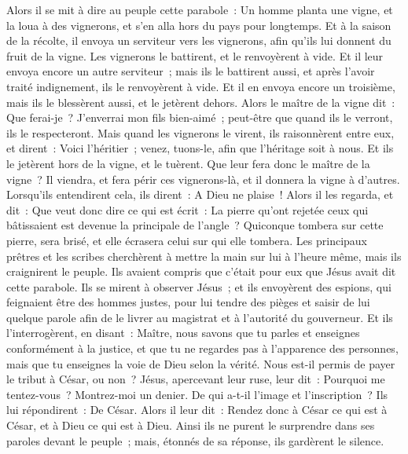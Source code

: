 \begin{multicols}{2}
Alors il se mit à dire au peuple cette parabole~: Un homme planta une vigne, et la loua à des vignerons, et s'en alla hors du pays pour longtemps.
Et à la saison de la récolte, il envoya un serviteur vers les vignerons, afin qu'ils lui donnent du fruit de la vigne. Les vignerons le battirent, et le renvoyèrent à vide.
Et il leur envoya encore un autre serviteur~; mais ils le battirent aussi, et après l'avoir traité indignement, ils le renvoyèrent à vide.
Et il en envoya encore un troisième, mais ils le blessèrent aussi, et le jetèrent dehors.
Alors le maître de la vigne dit~: Que ferai-je~? J'enverrai mon fils bien-aimé~; peut-être que quand ils le verront, ils le respecteront.
Mais quand les vignerons le virent, ils raisonnèrent entre eux, et dirent~: Voici l'héritier~; venez, tuons-le, afin que l'héritage soit à nous.
Et ils le jetèrent hors de la vigne, et le tuèrent. Que leur fera donc le maître de la vigne~?
Il viendra, et fera périr ces vignerons-là, et il donnera la vigne à d'autres. Lorsqu'ils entendirent cela, ils dirent~: A Dieu ne plaise~!
Alors il les regarda, et dit~: Que veut donc dire ce qui est écrit~: La pierre qu'ont rejetée ceux qui bâtissaient est devenue la principale de l'angle~?
Quiconque tombera sur cette pierre, sera brisé, et elle écrasera celui sur qui elle tombera.
Les principaux prêtres et les scribes cherchèrent à mettre la main sur lui à l'heure même, mais ils craignirent le peuple. Ils avaient compris que c'était pour eux que Jésus avait dit cette parabole.
Ils se mirent à observer Jésus~; et ils envoyèrent des espions, qui feignaient être des hommes justes, pour lui tendre des pièges et saisir de lui quelque parole afin de le livrer au magistrat et à l'autorité du gouverneur.
Et ils l'interrogèrent, en disant~: Maître, nous savons que tu parles et enseignes conformément à la justice, et que tu ne regardes pas à l'apparence des personnes, mais que tu enseignes la voie de Dieu selon la vérité.
Nous est-il permis de payer le tribut à César, ou non~?
Jésus, apercevant leur ruse, leur dit~: Pourquoi me tentez-vous~?
Montrez-moi un denier. De qui a-t-il l'image et l'inscription~? Ils lui répondirent~: De César.
Alors il leur dit~: Rendez donc à César ce qui est à César, et à Dieu ce qui est à Dieu.
Ainsi ils ne purent le surprendre dans ses paroles devant le peuple~; mais, étonnés de sa réponse, ils gardèrent le silence.

\end{multicols}
